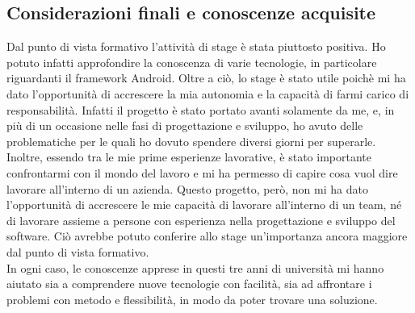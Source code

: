 \documentclass[../Tesi.tex]{subfiles}
\begin{document}
	\subsection{Considerazioni finali e conoscenze acquisite}
	Dal punto di vista formativo l'attività di stage è stata piuttosto positiva. Ho potuto infatti approfondire la conoscenza di varie tecnologie, in particolare riguardanti il framework Android. Oltre a ciò, lo stage è stato utile poichè mi ha dato l'opportunità di accrescere la mia autonomia e la capacità di farmi carico di responsabilità. Infatti il progetto è stato portato avanti solamente da me, e, in più di un occasione nelle fasi di progettazione e sviluppo, ho avuto delle problematiche per le quali ho dovuto spendere diversi giorni per superarle. Inoltre, essendo tra le mie prime esperienze lavorative, è stato importante confrontarmi con il mondo del lavoro e mi ha permesso di capire cosa vuol dire lavorare all'interno di un azienda. Questo progetto, però, non mi ha dato l'opportunità di accrescere le mie capacità di lavorare all'interno di un team, né di lavorare assieme a persone con esperienza nella progettazione e sviluppo del software. Ciò avrebbe potuto conferire allo stage un'importanza ancora maggiore dal punto di vista formativo.\\
	In ogni caso, le conoscenze apprese in questi tre anni di università mi hanno aiutato sia a comprendere nuove tecnologie con facilità, sia ad affrontare i problemi con metodo e flessibilità, in modo da poter trovare una soluzione. 
\end{document}
